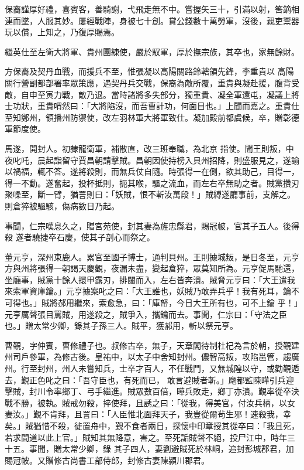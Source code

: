 \begin{pinyinscope}
 保裔謹厚好禮，喜賓客，善騎謝，弋飛走無不中。嘗握矢三十，引滿以射，筈鏑相連而墜，人服其妙。屢經戰陣，身被七十創。貸公錢數十萬勞軍，沒後，親吏鬻器玩以償，上知之，乃復厚賜焉。



 繼英仕至左衛大將軍、貴州團練使，嚴於馭軍，厚於撫宗族，其卒也，家無餘財。



 方保裔及契丹血戰，而援兵不至，惟張凝以高陽關路鈴轄領先鋒，李重貴以
 高陽關行營副都部署率眾策應，遇契丹兵交戰，保裔為敵所覆，重貴與凝赴援，腹背受敵，自申至寅力戰，敵乃退。當時諸將多失部分，獨重貴、凝全軍還屯，凝議上將士功狀，重貴喟然曰：「大將陷沒，而吾曹計功，何面目也。」上聞而嘉之。重貴仕至知鄭州，領播州防禦使，改左羽林軍大將軍致仕。凝加殿前都虞候，卒，贈彰德軍節度使。



 馬遂，開封人。初隸龍衛軍，補散直，改三班奉職，為北京
 指使。聞王則叛，中夜叱吒，晨起詣留守賈昌朝請擊賊。昌朝因使持榜入貝州招降，則盛服見之，遂諭以禍福，輒不答。遂將殺則，而無兵仗自隨。時張得一在側，欲其助己，目得一，得一不動。遂奮起，投杯抵則，扼其喉，驅之流血，而左右卒無助之者。賊黨攢刃聚噪至，斷一臂，猶詈則曰：「妖賊，恨不斬汝萬段！」賊縛遂廳事前，支解之。則倉猝被驅駭，傷病數日乃起。



 事聞，仁宗嘆息久之，贈宮苑使，封其妻為旌忠縣君，賜冠帔，官其子五人。後得殺
 遂者驍捷卒石慶，使其子剖心而祭之。



 董元亨，深州束鹿人。累官至國子博士，通判貝州。王則據城叛，是日冬至，元亨方與州將張得一朝謁天慶觀，夜漏未盡，變起倉猝，眾莫知所為。元亨促馬馳還，坐廳事，賊黨十餘人擐甲露刃，排闥而入，左右皆奔潰。賊脅元亨曰：「大王遣我來索軍資庫鑰。」元亨據案叱之曰：「大王誰也，妖賊乃敢弄兵乎！我有死耳，鑰不可得也。」賊將郝用繼來，索愈急，曰：「庫帑，今日大王所有也，可不上鑰
 乎！」元亨厲聲張目罵賊，用遂殺之，賊爭入，攜鑰而去。事聞，仁宗曰：「守法之臣也。」贈太常少卿，錄其子孫三人。賊平，獲郝用，斬以祭元亨。



 曹覲，字仲賓，曹修禮子也。叔修古卒，無子，天章閣待制杜杞為言於朝，授覲建州司戶參軍，為修古後。皇祐中，以太子中舍知封州。儂智高叛，攻陷邕管，趨廣州。行至封州，州人未嘗知兵，士卒才百人，不任戰鬥，又無城隍以守，或勸覲遁去，覲正色叱之曰：「吾守臣也，有死而已，
 敢言避賊者斬。」麾都監陳曄引兵迎擊賊，封川令率鄉丁、弓手繼進。賊眾數百倍，曄兵敗走，鄉丁亦潰。覲率從卒決戰不勝，被執。賊戒勿殺，捽使拜，且誘之曰：「從我，得美官，付汝兵柄，以女妻汝。」覲不肯拜，且詈曰：「人臣惟北面拜天子，我豈從爾茍生邪！速殺我，幸矣。」賊猶惜不殺，徙置舟中，覲不食者兩日，探懷中印章授其從卒曰：「我且死，若求間道以此上官。」賊知其無降意，害之。至死詬賊聲不絕，投尸江中，時年三十五。事聞，贈太常少卿，錄
 其子四人，妻劉避賊死於林峒，追封彭城郡君，加賜冠帔。又贈修古尚書工部侍郎，封修古妻陳潁川郡君。




\end{pinyinscope}
